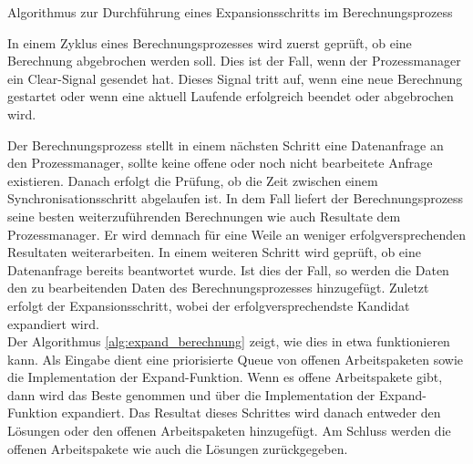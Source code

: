 \begin{algorithm}[H]
    \DontPrintSemicolon
    \caption{Algorithmus zur Durchführung eines Expansionsschritts im Berechnungsprozess}
    \label{alg:distribute_manager}
\end{algorithm}

In einem Zyklus eines Berechnungsprozesses wird zuerst geprüft, ob eine Berechnung abgebrochen werden soll. Dies ist der
Fall, wenn der Prozessmanager ein \glqq Clear-Signal\grqq{} gesendet hat. Dieses Signal tritt auf, wenn eine neue
Berechnung gestartet oder wenn eine aktuell Laufende erfolgreich beendet oder abgebrochen wird.

Der Berechnungsprozess stellt in einem nächsten Schritt eine Datenanfrage an den Prozessmanager, sollte keine offene oder
noch nicht bearbeitete Anfrage existieren. Danach erfolgt die Prüfung, ob die Zeit zwischen einem Synchronisationsschritt
abgelaufen ist. In dem Fall liefert der Berechnungsprozess seine besten weiterzuführenden Berechnungen wie auch Resultate
dem Prozessmanager. Er wird demnach für eine Weile an weniger erfolgversprechenden Resultaten weiterarbeiten. In einem
weiteren Schritt wird geprüft, ob eine Datenanfrage bereits beantwortet wurde. Ist dies der Fall, so werden die
Daten den zu bearbeitenden Daten des Berechnungsprozesses hinzugefügt. Zuletzt erfolgt der Expansionsschritt, wobei der
erfolgversprechendste Kandidat expandiert wird. \\
Der Algorithmus \ref{alg:expand_berechnung} zeigt, wie dies in etwa funktionieren kann.
Als Eingabe dient eine priorisierte Queue von offenen Arbeitspaketen sowie die Implementation der \glqq Expand-Funktion\grqq.
Wenn es offene Arbeitspakete gibt, dann wird das Beste genommen und über die Implementation der
\glqq Expand-Funktion\grqq{} expandiert.
Das Resultat dieses Schrittes wird danach entweder den Lösungen oder den offenen Arbeitspaketen hinzugefügt.
Am Schluss werden die offenen Arbeitspakete wie auch die Lösungen zurückgegeben.

